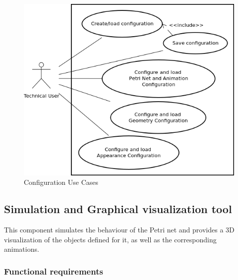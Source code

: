 \begin{figure}[htp]
\begin{center}
  \includegraphics[scale=0.5]{image/uc_configurator.png}
  \caption{Configuration Use Cases}
  \label{fig:configuration_use_cases}
\end{center}
\end{figure}

\newpage
\subsection{Simulation and Graphical visualization tool}

This component simulates the behaviour of the Petri net and provides a 3D
visualization of the objects defined for it, as well as the corresponding animations.

\subsubsection{Functional requirements}

